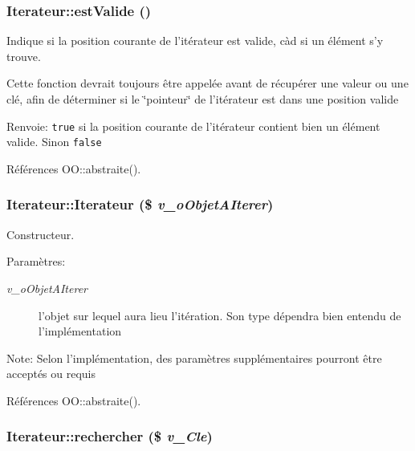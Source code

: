 \subsubsection{\setlength{\rightskip}{0pt plus 5cm}Iterateur::estValide ()}\label{class_iterateur_33d904743c851b2c959c514ecce923c8}


Indique si la position courante de l'itérateur est valide, càd si un élément s'y trouve. 

Cette fonction devrait toujours être appelée avant de récupérer une valeur ou une clé, afin de déterminer si le \char`\"{}pointeur\char`\"{} de l'itérateur est dans une position valide

\begin{Desc}
\item[Renvoie:]{\tt true} si la position courante de l'itérateur contient bien un élément valide. Sinon {\tt false} \end{Desc}


Références OO::abstraite().
\subsubsection{\setlength{\rightskip}{0pt plus 5cm}Iterateur::Iterateur (\$ {\em v\_\-oObjetAIterer})}\label{class_iterateur_06ee079b3a67f46c02cd50ffab4913f7}


Constructeur. 

\begin{Desc}
\item[Paramètres:]
\begin{description}
\item[{\em v\_\-oObjetAIterer}]l'objet sur lequel aura lieu l'itération. Son type dépendra bien entendu de l'implémentation\end{description}
\end{Desc}
\begin{Desc}
\item[Note:]Selon l'implémentation, des paramètres supplémentaires pourront être acceptés ou requis \end{Desc}


Références OO::abstraite().
\subsubsection{\setlength{\rightskip}{0pt plus 5cm}Iterateur::rechercher (\$ {\em v\_\-Cle})}\label{class_iterateur_b05ee08c7fc02253222a8f3604b65804}


